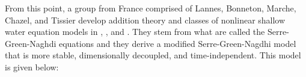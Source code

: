 From this point, a group from France comprised of Lannes, Bonneton, Marche, Chazel, and Tissier develop addition theory and classes of nonlinear shallow water equation models in \citep{bonneton2011splitting}, \citep{lannes2009derivation}, and \citep{lannes2015new}. They stem from what are called the Serre-Green-Naghdi equations and they derive a modified Serre-Green-Nagdhi model that is more stable, dimensionally decoupled, and time-independent. This model is given below:
%
%
%
